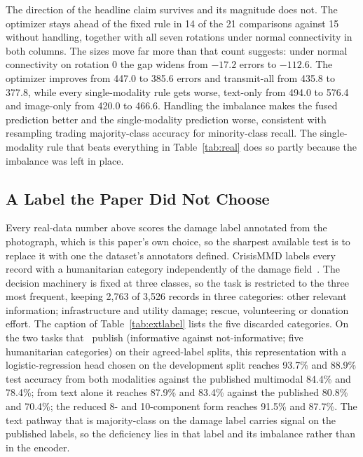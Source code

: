 \documentclass[conference,a4paper]{IEEEtran}
\newif\ifsubmission
\newcommand{\masteronly}[1]{\ifsubmission\else#1\fi}
\begin{document}
The direction of the headline claim survives and its magnitude does not. The optimizer
stays ahead of the fixed rule in 14 of the 21 comparisons against 15 without handling, together with all seven rotations under normal connectivity in both columns. The sizes move far more
than that count suggests: under normal connectivity on rotation 0 the gap widens from
$-17.2$ errors to $-112.6$. The optimizer
improves from 447.0 to 385.6 errors and transmit-all
from 435.8 to 377.8, while every single-modality rule gets worse, text-only from 494.0 to
576.4 and image-only from 420.0 to 466.6. Handling the imbalance makes the fused prediction better and the single-modality prediction worse, consistent with resampling trading majority-class accuracy for minority-class recall. The single-modality rule
that beats everything in Table~\ref{tab:real} does so partly because the imbalance was
left in place.

\subsection{A Label the Paper Did Not Choose}
\label{sec:reallabel}
Every real-data number above scores the damage label annotated from the photograph, which is this paper's own choice, so the sharpest available test is to replace it with one the dataset's annotators defined. CrisisMMD labels every record with a humanitarian category independently of the damage field~\cite{crisismmd}. The decision machinery is fixed at three classes, so the task is restricted to the three most frequent, keeping 2,763 of 3,526 records in three categories: other relevant information; infrastructure and utility damage; rescue, volunteering or donation effort. \ifsubmission \masteronly{The five categories dropped are: not humanitarian (398 records), injured or dead people (187), affected individuals (150), vehicle damage (21) and missing or found people (7). }\else The caption of Table~\ref{tab:extlabel} lists the five discarded categories. \fi On the two tasks that~\cite{ofli2020} publish (informative against not-informative; five humanitarian categories) on their agreed-label splits, this representation with a logistic-regression head chosen on the development split reaches 93.7\% and 88.9\% test accuracy from both modalities against the published multimodal 84.4\% and 78.4\%; from text alone it reaches 87.9\% and 83.4\% against the published 80.8\% and 70.4\%; the reduced 8- and 10-component form reaches 91.5\% and 87.7\%. The text pathway that is majority-class on the damage label carries signal on the published labels, so the deficiency lies in that label and its imbalance rather than in the encoder.
\end{document}
